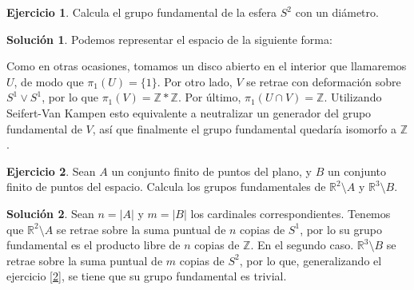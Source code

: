 \documentclass{article}
\theoremstyle{plain}
\theoremstyle{definition}
\newtheorem{exercise}{Ejercicio}
\newtheorem*{sol*}{Solución}
\newcommand{\Z}{\mathbb{Z}}
\begin{document}
\newpage

\begin{exercise}

Calcula el grupo fundamental de la esfera $S^2$ con un di\'ametro.

\end{exercise}
\begin{sol*} Podemos representar el espacio de la siguiente forma:\


Como en otras ocasiones, tomamos un disco abierto en el interior que llamaremos $U$, de modo que $\pi_1(U)=\{1\}$. Por otro lado, $V$ se retrae con deformación sobre $S^1\vee S^1$, por lo que $\pi_1(V)=\Z*\Z$. Por último, $\pi_1(U\cap V)=\Z$. Utilizando Seifert-Van Kampen esto equivalente a neutralizar un generador del grupo fundamental de $V$, así que finalmente el grupo fundamental quedaría isomorfo a $\Z$. 
\end{sol*}

\newpage

\begin{exercise}

Sean $A$ un conjunto finito de puntos del plano, y $B$ un conjunto finito de puntos del espacio. Calcula los grupos fundamentales de $\mathbb{R}^2\setminus A$ y $\mathbb{R}^3\setminus B$.

\end{exercise}
\begin{sol*}
Sean $n=|A|$ y $m=|B|$ los cardinales correspondientes. Tenemos que $\mathbb{R}^2\setminus A$ se retrae sobre la suma puntual de $n$ copias de $S^1$, por lo su grupo fundamental es el producto libre de $n$ copias de $\Z$. En el segundo caso. $\mathbb{R}^3\setminus B$ se retrae sobre la suma puntual de $m$ copias de $S^2$, por lo que, generalizando el ejercicio \ref{2}, se tiene que su grupo fundamental es trivial.
\end{sol*}
\end{document}
